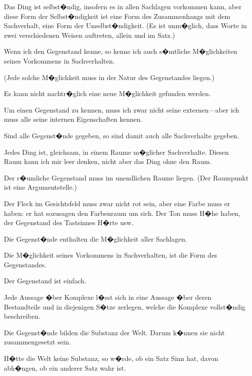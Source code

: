 {Das Ding ist selbst�ndig, insofern es in allen
 Sachlagen vorkommen kann, aber
diese Form der Selbst�ndigkeit ist eine Form des
Zusammenhangs mit dem Sachverhalt, eine Form
der Unselbst�ndigkeit. (Es ist unm�glich, dass
Worte in zwei verschiedenen Weisen auftreten,
allein und im Satz.)}


{Wenn ich den Gegenstand kenne, so kenne ich
auch s�mtliche M�glichkeiten seines Vorkommens
in Sachverhalten.

(Jede solche M�glichkeit muss in der Natur des
Gegenstandes liegen.)

Es kann nicht nachtr�glich eine neue M�glichkeit
gefunden werden.}


{Um einen Gegenstand zu kennen, muss ich zwar
nicht seine externen---aber ich muss alle seine
internen Eigenschaften kennen.}


{Sind alle Gegenst�nde gegeben, so sind damit
auch alle  Sachverhalte gegeben.}


{Jedes Ding ist, gleichsam, in einem Raume
m�glicher Sachverhalte. Diesen Raum kann ich
mir leer denken, nicht aber das Ding ohne den
Raum.}


{Der r�umliche Gegenstand muss im unendlichen
Raume liegen. (Der Raumpunkt ist eine Argumentstelle.)

Der Fleck im Gesichtsfeld muss zwar nicht rot
sein, aber eine Farbe muss er haben: er hat sozusagen
den Farbenraum um sich. Der Ton muss
 H�he haben, der Gegenstand des Tastsinnes
 H�rte usw.}


{Die Gegenst�nde enthalten die M�glichkeit aller
Sachlagen.}


{Die M�glichkeit seines Vorkommens in Sachverhalten,
ist die Form des Gegenstandes.}


{Der Gegenstand ist einfach.}


{Jede Aussage �ber Komplexe l�sst sich in eine
Aussage �ber deren Bestandteile und in diejenigen
S�tze zerlegen, welche die Komplexe vollst�ndig
beschreiben.}


{Die Gegenst�nde bilden die Substanz der Welt.
Darum k�nnen sie nicht zusammengesetzt sein.}


{H�tte die Welt keine Substanz, so w�rde, ob ein
Satz Sinn hat, davon abh�ngen, ob ein anderer Satz
wahr ist.}


